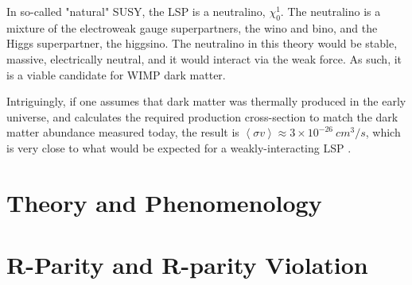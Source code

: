 In so-called "natural" SUSY, the LSP is a neutralino, $\chi_0^{1}$.
The neutralino is a mixture of the electroweak gauge superpartners, the wino and bino, and the Higgs superpartner, the higgsino.
The neutralino in this theory would be stable, massive, electrically neutral, and it would interact via the weak force.
As such, it is a viable candidate for WIMP dark matter.

Intriguingly, if one assumes that dark matter was thermally produced in the early universe,
and calculates the required production cross-section to match the dark matter abundance measured today,
the result is $\left<\sigma v\right> \approx 3 \times 10^{-26}~cm^{3}/s$,
which is very close to what would be expected for a weakly-interacting LSP .\cite{susy-dark-matter-1996}

\section{Theory and Phenomenology}\label{sec:susy_theory}

\section{R-Parity and R-parity Violation}\label{sec:susy_rpv}
